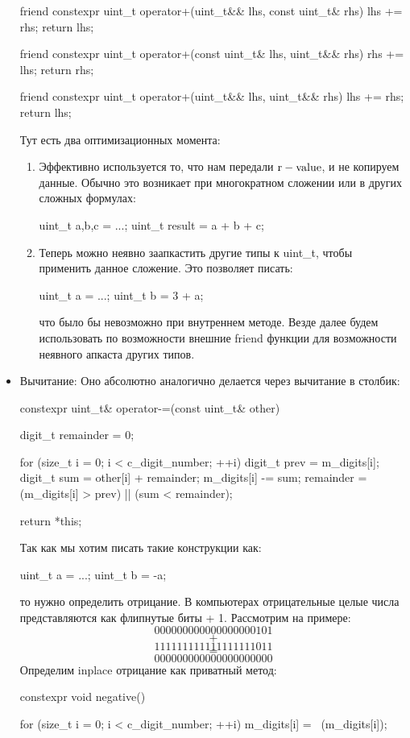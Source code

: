 \begin{itemize}
\begin{cppcode}
friend constexpr uint_t operator+(uint_t&& lhs, const uint_t& rhs) {
    lhs += rhs;
    return lhs;
}

friend constexpr uint_t operator+(const uint_t& lhs, uint_t&& rhs) {
    rhs += lhs;
    return rhs;
}

friend constexpr uint_t operator+(uint_t&& lhs, uint_t&& rhs) {
    lhs += rhs;
    return lhs;
}
    \end{cppcode}
    Тут есть два оптимизационных момента:
    \begin{enumerate}
      \item Эффективно используется то, что нам передали $\rm r-value$, и не копируем данные. Обычно это возникает при многократном сложении или в других сложных формулах:
      \begin{cppcode}
uint_t a,b,c = ...;
uint_t result = a + b + c;
      \end{cppcode}
      \item Теперь можно неявно заапкастить другие типы к uint\_t, чтобы применить данное сложение. Это позволяет писать:
      \begin{cppcode}
uint_t a = ...;
uint_t b = 3 + a;
      \end{cppcode}
      что было бы невозможно при внутреннем методе. Везде далее будем использовать по возможности внешние friend функции для возможности неявного апкаста других типов.
    \end{enumerate}
  \item Вычитание:
  Оно абсолютно аналогично делается через вычитание в столбик:
  \begin{cppcode}
constexpr uint_t& operator-=(const uint_t& other) {
    digit_t remainder = 0;

    for (size_t i = 0; i < c_digit_number; ++i) {
        digit_t prev = m_digits[i];
        digit_t sum = other[i] + remainder;
        m_digits[i] -= sum;
        remainder = (m_digits[i] > prev) || (sum < remainder);
    }

    return *this;
}
  \end{cppcode}
  Так как мы хотим писать такие конструкции как:
  \begin{cppcode}
uint_t a = ...;
uint_t b = -a;
  \end{cppcode}
  то нужно определить отрицание. В компьютерах отрицательные целые числа представляются как флипнутые биты + 1. Рассмотрим на примере:
  \[000000000000000000101\]
  \[+\]
  \[111111111111111111011\]
  \[=\]
  \[000000000000000000000\]
  Определим inplace отрицание как приватный метод:
  \begin{cppcode}
constexpr void negative() {
    for (size_t i = 0; i < c_digit_number; ++i) {
        m_digits[i] = ~(m_digits[i]);
    }

}
\end{cppcode}
\end{itemize}
